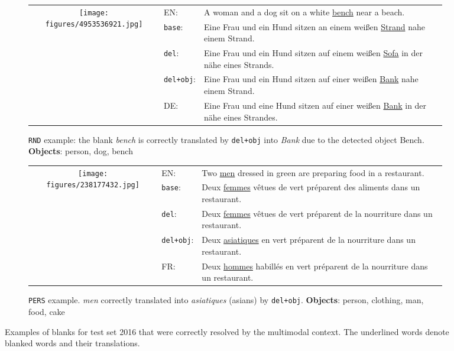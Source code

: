 \documentclass[11pt,a4paper]{article}
\newcommand{\base}{\texttt{base}\xspace}
\newcommand{\delib}{\texttt{del}\xspace}
\newcommand{\delibattobj}{\texttt{del+obj}\xspace}
\newcommand{\rnd}{\texttt{RND}\xspace}
\newcommand{\pers}{\texttt{PERS}\xspace}
\begin{document}
\newpage
\begin{figure*}[ht!]
\small{
  \begin{subfigure}[c]{\textwidth}
  \vspace{1em}
    \begin{tabular}{c p{1.5cm}p{9cm}}
      \multirow{3}[15]{*}{\texttt{[image: figures/4953536921.jpg]}} & EN: & A woman and a dog sit on a white \underline{bench} near a beach.\\[1ex]
      & \base: & Eine Frau und ein Hund sitzen an einem wei{\ss}en \underline{Strand} nahe einem Strand. \\[1ex]
      & \delib: & Eine Frau und ein Hund sitzen auf einem wei{\ss}en \underline{Sofa} in der n\"{a}he eines Strands. \\[1ex]
      & \delibattobj: & Eine Frau und ein Hund sitzen auf einer wei{\ss}en \underline{Bank} nahe einem Strand. \\[1ex]
      & DE: & Eine Frau und eine Hund sitzen auf einer wei{\ss}en \underline{Bank} in der n\"{a}he eines Strandes.\\[1ex]
  \end{tabular}
  \caption{\rnd example: the blank \textit{bench} is correctly translated by \delibattobj into \textit{Bank} due to the detected object Bench. \textbf{Objects}: person, dog, bench}
  \end{subfigure}
  \begin{subfigure}[c]{\textwidth}
  \vspace{1em}
    \begin{tabular}{c p{1.5cm}p{9cm}}
      \multirow{3}{*}{\texttt{[image: figures/238177432.jpg]}} & 
      EN: & Two \underline{men} dressed in green are preparing food in a restaurant.\\[1ex]
      & \base: & Deux \underline{femmes} v\^{e}tues de vert pr\'{e}parent des aliments dans un restaurant. \\[1ex]
      & \delib: & Deux \underline{femmes} v\^{e}tues de vert pr\'{e}parent de la nourriture dans un restaurant.\\[1ex]
      & \delibattobj: & Deux \underline{asiatiques} en vert pr\'{e}parent de la nourriture dans un restaurant. \\[1ex]
      & FR: & Deux \underline{hommes} habill\'{e}s en vert pr\'{e}parent de la nourriture dans un restaurant. \\[1ex]
  \end{tabular}
  \caption{\pers example. \textit{men} correctly translated into \textit{asiatiques} (asians) by \delibattobj. \textbf{Objects}: person, clothing, man, food, cake}
  \end{subfigure}}
\caption{\label{table:gapped_ex2} Examples of blanks for test set 2016 that were correctly resolved by the multimodal context. The underlined words denote blanked words and their translations.}
\end{figure*}
\end{document}
